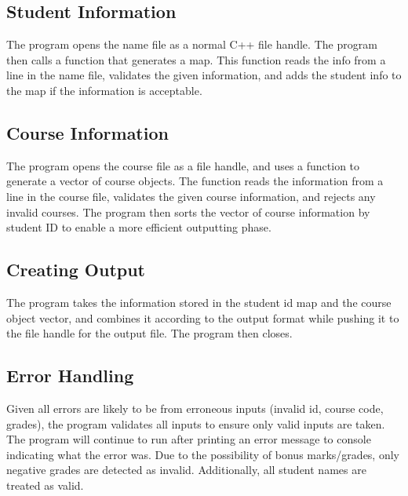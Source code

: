 \documentclass{article}
\begin{document}
\subsection{Student Information}
The program opens the name file as a normal C++ file handle. The program then calls a function that generates a map. This function reads the info from a line in the name file, validates the given information, and adds the student info to the map if the information is acceptable. 

\subsection{Course Information}
The program opens the course file as a file handle, and uses a function to generate a vector of course objects. The function reads the information from a line in the course file, validates the given course information, and rejects any invalid courses. The program then sorts the vector of course information by student ID to enable a more efficient outputting phase.

\subsection{Creating Output}
The program takes the information stored in the student id map and the course object vector, and combines it according to the output format while pushing it to the file handle for the output file. The program then closes.

\subsection{Error Handling}
Given all errors are likely to be from erroneous inputs (invalid id, course code, grades), the program validates all inputs to ensure only valid inputs are taken. The program will continue to run after printing an error message to console indicating what the error was. Due to the possibility of bonus marks/grades, only negative grades are detected as invalid. Additionally, all student names are treated as valid.
\end{document}
